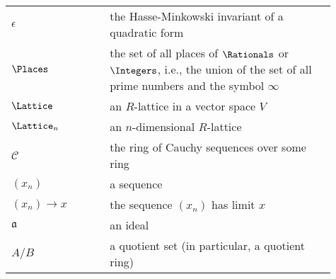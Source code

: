 \begin{longtable}{p{0.25\linewidth} p{0.01\linewidth} p{0.65\linewidth}}
    \(\epsilon\) && the Hasse-Minkowski invariant of a quadratic form\\
    \(\Places\) && the set of all places of \(\Rationals\) or \(\Integers\),
    i.e., the union of the set of all prime numbers and the symbol \(\infty\)\\
    \(\Lattice\) && an \(R\)-lattice in a vector space \(V\)\\
    \(\Lattice_n\) && an \(n\)-dimensional \(R\)-lattice\\
    \(\mathscr{C}\) && the ring of Cauchy sequences over some ring\\
    \((x_n)\) && a sequence\\
    \((x_n) \to x\) && the sequence \((x_n)\) has limit \(x\)\\
    \(\mathfrak{a}\) && an ideal\\
    \(A / B\) && a quotient set (in particular, a quotient ring)
\end{longtable}